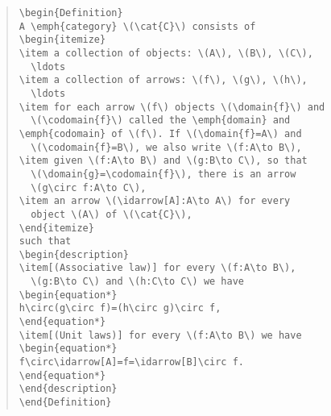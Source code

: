 \begin{quote}
\begin{verbatim}
\begin{Definition}
A \emph{category} \(\cat{C}\) consists of
\begin{itemize}
\item a collection of objects: \(A\), \(B\), \(C\),
  \ldots
\item a collection of arrows: \(f\), \(g\), \(h\),
  \ldots
\item for each arrow \(f\) objects \(\domain{f}\) and
  \(\codomain{f}\) called the \emph{domain} and 
\emph{codomain} of \(f\). If \(\domain{f}=A\) and 
  \(\codomain{f}=B\), we also write \(f:A\to B\),
\item given \(f:A\to B\) and \(g:B\to C\), so that 
  \(\domain{g}=\codomain{f}\), there is an arrow 
  \(g\circ f:A\to C\),
\item an arrow \(\idarrow[A]:A\to A\) for every 
  object \(A\) of \(\cat{C}\),
\end{itemize}
such that
\begin{description}
\item[(Associative law)] for every \(f:A\to B\), 
  \(g:B\to C\) and \(h:C\to C\) we have
\begin{equation*}
h\circ(g\circ f)=(h\circ g)\circ f,
\end{equation*}
\item[(Unit laws)] for every \(f:A\to B\) we have
\begin{equation*}
f\circ\idarrow[A]=f=\idarrow[B]\circ f.
\end{equation*}
\end{description}
\end{Definition}
\end{verbatim}
\end{quote}


